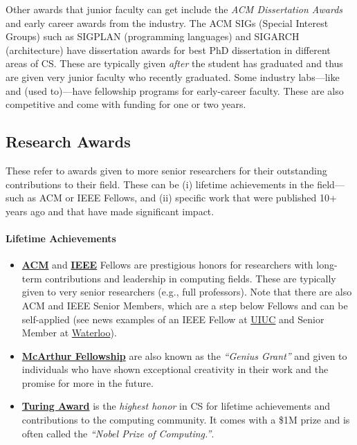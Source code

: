 \documentclass[oneside,11pt]{book}
\begin{document}
Other awards that junior faculty can get include the \emph{ACM Dissertation Awards} and early career awards from the industry. 
The ACM SIGs (Special Interest Groups) such as SIGPLAN (programming languages) and SIGARCH (architecture) have  dissertation awards for best PhD dissertation in different areas of CS. These are typically given \emph{after} the student has graduated and thus are given very junior faculty who recently graduated.   
Some industry labs---like  and  (used to)---have fellowship programs for early-career faculty. These are also competitive and come with funding for one or two years. 




\subsection{Research Awards}\label{sec:research-awards}

These refer to awards given to more senior researchers for their outstanding contributions to their field.
These can be (i) lifetime achievements in the field---such as ACM or IEEE Fellows, and (ii) specific work that were published 10+ years ago and that have made significant impact. 


\paragraph{Lifetime Achievements} 

\begin{itemize}  
  \item \href{https://awards.acm.org/fellows}{\textbf{ACM}} and \href{https://www.ieee.org/communities-connection/awards-recognition/ieee-fellows}{\textbf{IEEE}} Fellows are prestigious honors for researchers with long-term contributions and leadership in computing fields. These are typically given to very senior researchers (e.g., full professors). Note that there are also ACM and IEEE Senior Members, which are a step below Fellows and can be self-applied (see news examples of an IEEE Fellow at \href{https://siebelschool.illinois.edu/news/elevation-to-ieee-fellow-further-proves-significance-of-hoiems-impact-in-computer-vision}{UIUC} and Senior Member at \href{https://uwaterloo.ca/computer-science/news/ian-goldberg-named-senior-member-ieee}{Waterloo}).
  
  \item \textbf{\href{https://www.macfound.org/programs/awards/fellows/}{McArthur Fellowship}} are also known as the \emph{``Genius Grant''} and given to individuals who have shown exceptional creativity in their work and the promise for more in the future. 
  
  \item \textbf{\href{https://awards.acm.org/turing}{Turing Award}} is the \emph{highest honor} in CS for lifetime achievements and contributions to the computing community. It comes with a \$1M prize and is often called the \emph{``Nobel Prize of Computing.''}.
\end{itemize}
\end{document}
